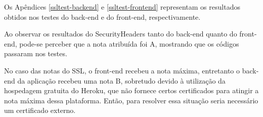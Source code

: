 Os Apêndices \ref{ssltest-backend} e \ref{ssltest-frontend} representam os resultados obtidos nos testes do \gls{back-end} e do \gls{front-end}, respectivamente.

Ao observar os resultados do SecurityHeaders tanto do \gls{back-end} quanto do \gls{front-end}, pode-se perceber que a nota atribuída foi A, mostrando que os códigos passaram nos testes. 

No caso das notas do SSL, o \gls{front-end} recebeu a nota máxima, entretanto o \gls{back-end} da aplicação recebeu uma nota B, sobretudo devido à utilização da hospedagem gratuita do Heroku, que não fornece certos certificados para atingir a nota máxima dessa plataforma. Então, para resolver essa situação seria necessário um certificado externo. 